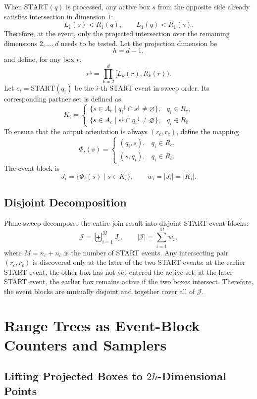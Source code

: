 \documentclass[11pt]{article}
\newcommand{\Rc}{R_c}
\newcommand{\Rbar}{R_{\bar c}}
\newcommand{\Start}{\mathrm{START}}
\newcommand{\proj}[1]{{#1}^{\downarrow}}
\newcommand{\J}{\mathcal J}
\begin{document}
When \(\Start(q)\) is processed, any active box \(s\) from the opposite side already satisfies intersection in dimension \(1\):
\[
 L_1(s)<R_1(q),\qquad L_1(q)<R_1(s).
\]
Therefore, at the event, only the projected intersection over the remaining dimensions \(2,\ldots,d\) needs to be tested. Let the projection dimension be
\[
 h=d-1,
\]
and define, for any box \(r\),
\[
 \proj r=\prod_{k=2}^{d}[L_k(r),R_k(r)).
\]
Let \(e_i=\Start(q_i)\) be the \(i\)-th START event in sweep order. Its corresponding partner set is defined as
\[
K_i=
\begin{cases}
\{s\in A_{\bar c}\mid \proj{q_i}\cap\proj{s}\neq\varnothing\}, & q_i\in\Rc,\\[2mm]
\{s\in A_c\mid \proj{s}\cap\proj{q_i}\neq\varnothing\}, & q_i\in\Rbar.
\end{cases}
\]
To ensure that the output orientation is always \((r_c,r_{\bar c})\), define the mapping
\[
\Phi_i(s)=
\begin{cases}
(q_i,s), & q_i\in\Rc,\\
(s,q_i), & q_i\in\Rbar.
\end{cases}
\]
The event block is
\[
 J_i=\{\Phi_i(s)\mid s\in K_i\},
 \qquad
 w_i=|J_i|=|K_i|.
\]

\subsection{Disjoint Decomposition}

Plane sweep decomposes the entire join result into disjoint START-event blocks:
\[
 \J=\biguplus_{i=1}^{M}J_i,
 \qquad
 |\J|=\sum_{i=1}^{M}w_i,
\]
where \(M=n_c+n_{\bar c}\) is the number of START events. Any intersecting pair \((r_c,r_{\bar c})\) is discovered only at the later of the two START events: at the earlier START event, the other box has not yet entered the active set; at the later START event, the earlier box remains active if the two boxes intersect. Therefore, the event blocks are mutually disjoint and together cover all of \(\J\).

\section{Range Trees as Event-Block Counters and Samplers}

\subsection{Lifting Projected Boxes to \texorpdfstring{\(2h\)}{2h}-Dimensional Points}
\end{document}
